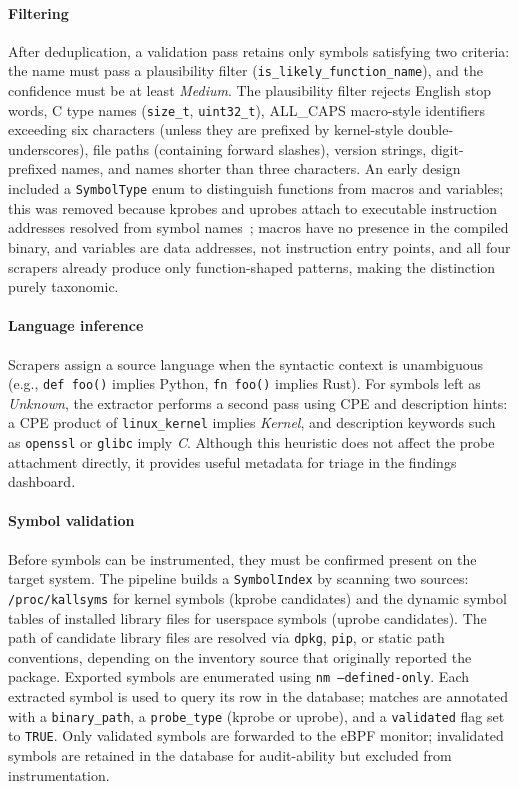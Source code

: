 \documentclass[conference]{IEEEtran}
\begin{document}
\paragraph{Filtering}
After deduplication, a validation pass retains only symbols satisfying two criteria: the name must pass a plausibility filter (\texttt{is\_likely\_function\_name}), and the confidence must be at least \textit{Medium}. The plausibility filter rejects English stop words, C type names (\texttt{size\_t}, \texttt{uint32\_t}), ALL\_CAPS macro-style identifiers exceeding six characters (unless they are prefixed by kernel-style double-underscores), file paths (containing forward slashes), version strings, digit-prefixed names, and names shorter than three characters. An early design included a \texttt{SymbolType} enum to distinguish functions from macros and variables; this was removed because kprobes and uprobes attach to executable instruction addresses resolved from symbol names~\cite{kernel_kprobes, kernel_uprobes}; macros have no presence in the compiled binary, and variables are data addresses, not instruction entry points, and all four scrapers already produce only function-shaped patterns, making the distinction purely taxonomic.

\paragraph{Language inference}
Scrapers assign a source language when the syntactic context is unambiguous (e.g., \texttt{def foo()} implies Python, \texttt{fn foo()} implies Rust). For symbols left as \textit{Unknown}, the extractor performs a second pass using CPE and description hints: a CPE product of \texttt{linux\_kernel} implies \textit{Kernel}, and description keywords such as \texttt{openssl} or \texttt{glibc} imply \textit{C}. Although this heuristic does not affect the probe attachment directly, it provides useful metadata for triage in the findings dashboard.

\paragraph{Symbol validation}
Before symbols can be instrumented, they must be confirmed present on the target system. The pipeline builds a \texttt{SymbolIndex} by scanning two sources: \texttt{/proc/kallsyms} for kernel symbols (kprobe candidates) and the dynamic symbol tables of installed library files for userspace symbols (uprobe candidates). The path of candidate library files are resolved via \texttt{dpkg}, \texttt{pip}, or static path conventions, depending on the inventory source that originally reported the package. Exported symbols are enumerated using \texttt{nm~--defined-only}. Each extracted symbol is used to query its row in the database; matches are annotated with a \texttt{binary\_path}, a \texttt{probe\_type} (kprobe or uprobe), and a \texttt{validated} flag set to \texttt{TRUE}. Only validated symbols are forwarded to the eBPF monitor; invalidated symbols are retained in the database for audit-ability but excluded from instrumentation.
\end{document}
